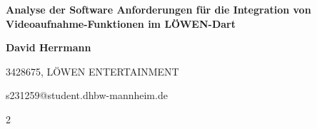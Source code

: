 \documentclass[a4paper,10pt]{article}
\begin{document}
	
	
	\setcounter{page}{1}

	\begin{center}
		{\LARGE\bfseries Analyse der Software Anforderungen für die Integration von Videoaufnahme-Funktionen im LÖWEN-Dart\par}
		\vspace{0.8cm}
		
		{\large\bfseries David Herrmann\par}
		\vspace{0.2cm}
		
		3428675, LÖWEN ENTERTAINMENT\par
		s231259@student.dhbw-mannheim.de
	\end{center}
	
	\vspace{0.8cm}
	
	\begin{multicols*}{2}
	
		

		
		
		
		
		

		

		
		
		
		
	\end{multicols*}
	
\end{document}
